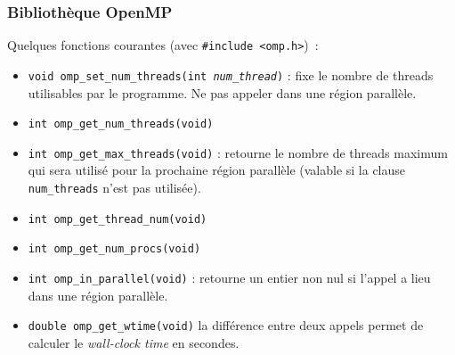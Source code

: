\documentclass{beamer}
\begin{document}










\begin{frame}[fragile]
  \frametitle{Bibliothèque OpenMP}

Quelques fonctions courantes (avec \texttt{#include <omp.h>})~:
\begin{itemize}
  \item {\tt void omp\_set\_num\_threads(int {\it num\_thread})} : fixe le nombre
    de threads utilisables par le programme. Ne pas appeler dans une région parallèle.
    
  \item {\tt int omp\_get\_num\_threads(void)}
  \item {\tt int omp\_get\_max\_threads(void)} : retourne le nombre de threads
    maximum qui sera utilisé pour la prochaine région parallèle (valable si la clause {\tt
      num\_threads} n'est pas utilisée).
    \item {\tt int omp\_get\_thread\_num(void)}
    \item {\tt int omp\_get\_num\_procs(void)}
    \item {\tt int omp\_in\_parallel(void)} : retourne un entier non nul si
      l'appel a lieu dans une région parallèle.
  \item {\tt double omp\_get\_wtime(void)} la différence entre deux appels
    permet de calculer le {\it wall-clock time} en secondes.
\end{itemize}

  
\end{frame}
\end{document}
